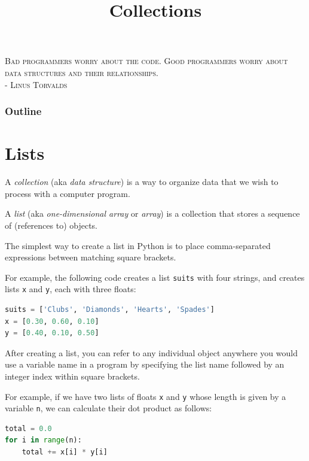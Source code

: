 \documentclass[8pt,a4paper,compress,handout]{beamer}
\title{Collections}
\date{}
\begin{document}
\begin{frame}
\begin{flushright}
\tiny \textsc{Bad programmers worry about the code. Good programmers worry about data structures and their relationships. \\ - Linus Torvalds}
\end{flushright}
\titlepage
\end{frame}

\begin{frame}
\frametitle{Outline}
\tableofcontents
\end{frame}

\section{Lists}
\begin{frame}[fragile]
A \emph{collection} (aka \emph{data structure}) is a way to organize data that we wish to process with a computer program.

\bigskip

A \emph{list} (aka \emph{one-dimensional array} or \emph{array}) is a collection that stores a sequence of (references to) objects.

\bigskip

The simplest way to create a list in Python is to place comma-separated expressions between matching square brackets. 

\bigskip

For example, the following code creates a list \lstinline{suits} with four strings, and creates lists \lstinline{x} and \lstinline{y}, each with three floats:

\begin{lstlisting}[language=Python]
suits = ['Clubs', 'Diamonds', 'Hearts', 'Spades']
x = [0.30, 0.60, 0.10]
y = [0.40, 0.10, 0.50]
\end{lstlisting}

\bigskip

After creating a list, you can refer to any individual object anywhere you would use a variable name in a program by specifying the list name followed by an integer index within square brackets.

\bigskip

For example, if we have two lists of floats \lstinline{x} and \lstinline{y} whose length is given by a variable \lstinline{n}, we can calculate their dot product as follows:

\begin{lstlisting}[language=Python]
total = 0.0
for i in range(n):
    total += x[i] * y[i]
\end{lstlisting} 
\end{frame}
\end{document}
